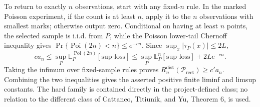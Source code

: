 To return to exactly \(n\) observations, start with any fixed-\(n\) rule.  In the marked Poisson experiment, if the count is at least \(n\), apply it to the \(n\) observations with smallest marks; otherwise output zero.  Conditional on having at least \(n\) points, the selected sample is i.i.d. from \(P\), while the Poisson lower-tail Chernoff inequality gives \(\Pr\{\operatorname{Poi}(2n)<n\}\leq e^{-cn}\).  Since \(\sup_x|\tau_P(x)|\leq2L\),
\[
ca_n\leq \sup_P\mathbb E_P^{\operatorname{Poi}(2n)}[\text{sup-loss}]
\leq \sup_P\mathbb E_P^n[\text{sup-loss}]+2Le^{-cn}.
\]
Taking the infimum over fixed-sample rules proves \(R_n^{\mathrm{dist}}(\mathcal P_{\mathrm{rect}})\geq c'a_n\).  Combining the two inequalities gives the asserted positive finite liminf and limsup constants.  The hard family is contained directly in the project-defined class; no relation to the different class of Cattaneo, Titiunik, and Yu, Theorem 6, is used.